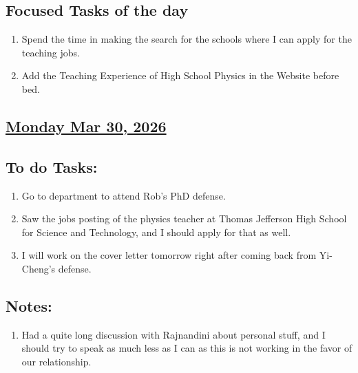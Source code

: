 \subsection*{Focused Tasks of the day}
\begin{enumerate}[\ding{212}]  
    \item Spend the time in making the search for the schools where I can apply for the teaching jobs.
    \item Add the Teaching Experience of High School Physics in the Website before bed.
     
\end{enumerate}
\subsection*{\underline{Monday Mar 30, 2026}}
\subsection*{To do Tasks:}
\begin{enumerate}
    \item Go to department to attend Rob's PhD defense.
    \item Saw the jobs posting of the physics teacher at Thomas Jefferson High School for Science and Technology, and I should apply for that as well.
    \item I will work on the cover letter tomorrow right after coming back from Yi-Cheng's defense.
\end{enumerate}
\subsection*{Notes:}
\begin{enumerate}
    \item Had a quite long discussion with Rajnandini about personal stuff, and I should try to speak as much less as I can as this is not working in the favor of our relationship.
\end{enumerate}
